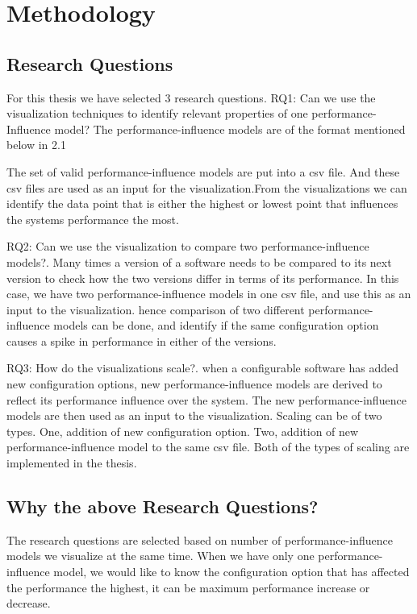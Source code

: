 \chapter{Methodology}
\label{example}

\section{Research Questions}
For this thesis we have selected 3 research questions. 
RQ1: Can we use the visualization techniques to identify relevant properties of one performance-Influence model? The performance-influence models are of the format mentioned below in 2.1

The set of valid performance-influence models are put into a csv file. And these csv files are used as an input for the visualization.From the visualizations we can identify the data point that is either the highest or lowest point that influences the systems performance the most.

RQ2: Can we use the visualization to compare two performance-influence models?. Many times a version of a software needs to be compared to its next version to check how the two versions differ in terms of its performance. In this case, we have two performance-influence models in one csv file, and use this as an input to the visualization. hence comparison of two different performance-influence models can be done, and identify if the same configuration option causes a spike in performance in either of the versions.

RQ3: How do the visualizations scale?. when a configurable software has added new configuration options, new performance-influence models are derived to reflect its performance influence over the system. The new performance-influence models are then used as an input to the visualization. Scaling can be of two types. One, addition of new configuration option. Two, addition of new performance-influence model to the same csv file. Both of the types of scaling are implemented in the thesis.

\section{Why the above Research Questions?}
The research questions are selected based on number of performance-influence models we visualize at the same time. When we have only one performance-influence model, we would like to know the configuration option that has affected the performance the highest, it can be maximum performance increase or decrease. 

